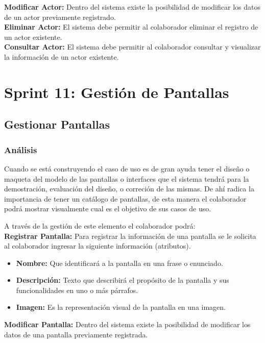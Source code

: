 \textbf {Modificar Actor:}
Dentro del sistema existe la posibilidad de modificar los datos de un actor previamente registrado.\\

\textbf {Eliminar Actor:} 
El sistema debe permitir al colaborador eliminar el registro de un actor existente.\\

\textbf {Consultar Actor:} 
El sistema debe permitir al colaborador consultar y visualizar la información de un actor existente.\\

\section{Sprint 11: Gestión de Pantallas}

\subsection{Gestionar Pantallas}
\subsubsection {Análisis}

Cuando se está construyendo el caso de uso es de gran ayuda tener el diseño o maqueta del modelo de las pantallas o interfaces que el sistema tendrá para la demostración, evaluación del diseño, o correción de las mismas. De ahí radica la importancia de tener un catálogo de pantallas, de esta manera el colaborador podrá mostrar visualmente cual es el objetivo de sus casos de uso.

A través de la gestión de este elemento el colaborador podrá:\\

\textbf {Registrar Pantalla:}
Para registrar la información de una pantalla se le solicita al colaborador ingresar la siguiente información (atributos).
\begin{itemize}
	\item \textbf{Nombre:} Que identificará a la pantalla en una frase o enunciado.
	\item \textbf{Descripción:} Texto que describirá el propósito de la pantalla y sus funcionalidades en uno o más párrafos.
	\item \textbf{Imagen:} Es la representación visual de la pantalla en una imagen.
\end{itemize}

\textbf {Modificar Pantalla:}
Dentro del sistema existe la posibilidad de modificar los datos de una pantalla previamente registrada.\\

